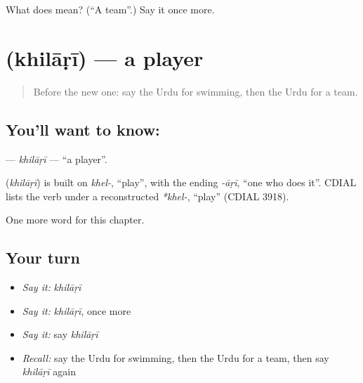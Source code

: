 \begin{tcolorbox}[breakable,colback=teal!4,colframe=teal!35!black,title={Before you move on}]
What does  mean? (\textquotedblleft{}A team\textquotedblright{}.) Say it once more.
\end{tcolorbox}
\section[\texorpdfstring{\ur{کھلاڑی} (khilāṛī)}{کھلاڑی (khilāṛī)}]{ (khilāṛī) — a player}

\label{lesson:UR-C228-khilari}



\begin{quote}
Before the new one: say the Urdu for swimming, then the Urdu for a team.
\end{quote}

\subsection*{You'll want to know: }
\textbf{} — \emph{khilāṛī} — \textquotedblleft{}a player\textquotedblright{}.

\begin{cousinweb}
\textbf{} (\emph{khilāṛī}) is built on \emph{khel-}, \textquotedblleft{}play\textquotedblright{}, with the ending \emph{-āṛī}, \textquotedblleft{}one who does it\textquotedblright{}. CDIAL lists the verb under a reconstructed \emph{*khel-}, \textquotedblleft{}play\textquotedblright{} (CDIAL 3918).
\end{cousinweb}

\begin{grammarlens}[title={What you've built}]
One more word for this chapter.
\end{grammarlens}

\subsection*{Your turn}
\begin{itemize}
\raggedright
  \item \emph{Say it:} \emph{khilāṛī}
  \item \emph{Say it:} \emph{khilāṛī}, once more
  \item \emph{Say it:} say \emph{khilāṛī}
  \item \emph{Recall:} say the Urdu for swimming, then the Urdu for a team, then say \emph{khilāṛī} again
\end{itemize}

